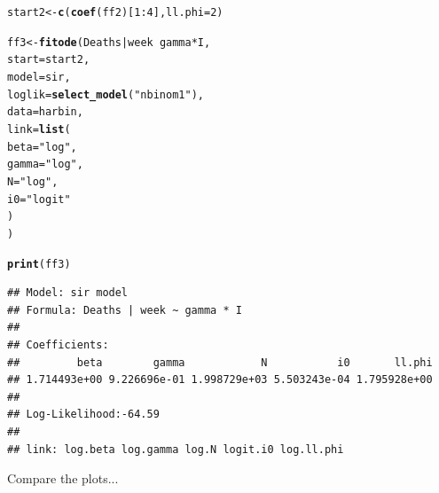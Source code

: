 \documentclass{article}\usepackage[]{graphicx}\usepackage[]{color}
\makeatletter
\newcommand{\hlnum}[1]{\textcolor[rgb]{0.686,0.059,0.569}{#1}}%
\newcommand{\hlstr}[1]{\textcolor[rgb]{0.192,0.494,0.8}{#1}}%
\newcommand{\hlopt}[1]{\textcolor[rgb]{0,0,0}{#1}}%
\newcommand{\hlstd}[1]{\textcolor[rgb]{0.345,0.345,0.345}{#1}}%
\newcommand{\hlkwb}[1]{\textcolor[rgb]{0.69,0.353,0.396}{#1}}%
\newcommand{\hlkwc}[1]{\textcolor[rgb]{0.333,0.667,0.333}{#1}}%
\newcommand{\hlkwd}[1]{\textcolor[rgb]{0.737,0.353,0.396}{\textbf{#1}}}%
\newenvironment{kframe}{%
 \def\at@end@of@kframe{}%
 \ifinner\ifhmode%
  \def\at@end@of@kframe{\end{minipage}}%
  \begin{minipage}{\columnwidth}%
 \fi\fi%
 \def\FrameCommand##1{\hskip\@totalleftmargin \hskip-\fboxsep
 \colorbox{shadecolor}{##1}\hskip-\fboxsep
     \hskip-\linewidth \hskip-\@totalleftmargin \hskip\columnwidth}%
 \MakeFramed {\advance\hsize-\width
   \@totalleftmargin\z@ \linewidth\hsize
   \@setminipage}}%
 {\par\unskip\endMakeFramed%
 \at@end@of@kframe}
\newenvironment{knitrout}{}{} %
\makeatother
\begin{document}
\begin{knitrout}
\color{fgcolor}\begin{kframe}
\begin{alltt}
\hlstd{start2} \hlkwb{<-} \hlkwd{c}\hlstd{(}\hlkwd{coef}\hlstd{(ff2)[}\hlnum{1}\hlopt{:}\hlnum{4}\hlstd{],} \hlkwc{ll.phi}\hlstd{=}\hlnum{2}\hlstd{)}

\hlstd{ff3} \hlkwb{<-} \hlkwd{fitode}\hlstd{(Deaths}\hlopt{|}\hlstd{week}\hlopt{~}\hlstd{gamma}\hlopt{*}\hlstd{I,}
    \hlkwc{start}\hlstd{=start2,}
    \hlkwc{model}\hlstd{=sir,}
    \hlkwc{loglik}\hlstd{=}\hlkwd{select_model}\hlstd{(}\hlstr{"nbinom1"}\hlstd{),}
    \hlkwc{data}\hlstd{=harbin,}
    \hlkwc{link}\hlstd{=}\hlkwd{list}\hlstd{(}
        \hlkwc{beta}\hlstd{=}\hlstr{"log"}\hlstd{,}
        \hlkwc{gamma}\hlstd{=}\hlstr{"log"}\hlstd{,}
        \hlkwc{N}\hlstd{=}\hlstr{"log"}\hlstd{,}
        \hlkwc{i0}\hlstd{=}\hlstr{"logit"}
    \hlstd{)}
\hlstd{)}

\hlkwd{print}\hlstd{(ff3)}
\end{alltt}
\begin{verbatim}
## Model: sir model 
## Formula: Deaths | week ~ gamma * I 
## 
## Coefficients:
##         beta        gamma            N           i0       ll.phi 
## 1.714493e+00 9.226696e-01 1.998729e+03 5.503243e-04 1.795928e+00 
## 
## Log-Likelihood:-64.59 
## 
## link: log.beta log.gamma log.N logit.i0 log.ll.phi
\end{verbatim}
\end{kframe}
\end{knitrout}

Compare the plots...
\end{document}
